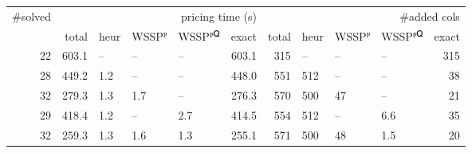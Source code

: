 \begin{tabular}{rrlllrrlllr}
\toprule
#solved & \multicolumn{5}{r}{pricing time (s)} & \multicolumn{5}{r}{#added cols} \\
 & total & heur & WSSPᴾ & WSSPᴾꟴ & exact & total & heur & WSSPᴾ & WSSPᴾꟴ & exact \\
\midrule
22 & 603.1 & -- & -- & -- & 603.1 & 315 & -- & -- & -- & 315 \\
28 & 449.2 & 1.2 & -- & -- & 448.0 & 551 & 512 & -- & -- & 38 \\
32 & 279.3 & 1.3 & 1.7 & -- & 276.3 & 570 & 500 & 47 & -- & 21 \\
29 & 418.4 & 1.2 & -- & 2.7 & 414.5 & 554 & 512 & -- & 6.6 & 35 \\
32 & 259.3 & 1.3 & 1.6 & 1.3 & 255.1 & 571 & 500 & 48 & 1.5 & 20 \\
\bottomrule
\end{tabular}
